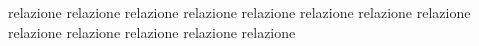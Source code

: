 \documentclass[11pt, twoside, twocolumn, a4paper]{article}
\numberwithin{equation}{section}
\numberwithin{figure}{section}
\numberwithin{table}{section}
\begin{document}
	

    \twocolumn

	{relazione}
    \twocolumn
	{relazione}
    \twocolumn
	{relazione}
    \twocolumn
	{relazione}
    \twocolumn
	{relazione}
    \twocolumn
	{relazione}
    \twocolumn
	{relazione}
    \twocolumn
	{relazione}
    \twocolumn
	{relazione}
    \twocolumn
	{relazione}
    \twocolumn
	{relazione}
    \twocolumn
	{relazione}
    \twocolumn
	{relazione}
\end{document}

